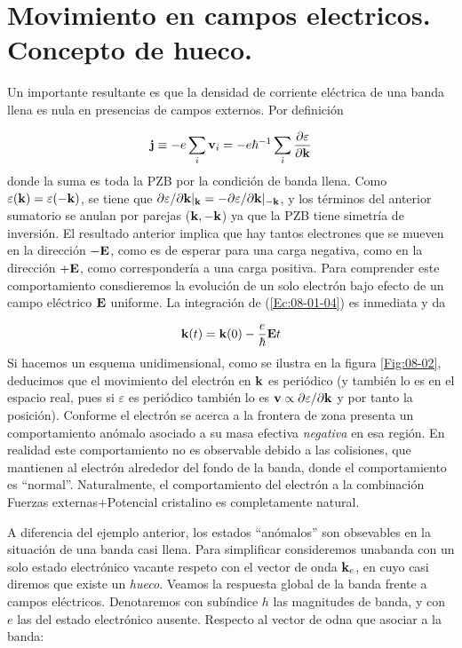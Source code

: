 \section{Movimiento en campos electricos. Concepto de hueco.}

Un importante resultante es que la densidad de corriente eléctrica de una banda llena es nula en presencias de campos externos. Por definición 

\begin{equation*}
	\mathbf{j} \equiv - e \sum_i \mathbf{v}_i= -e \hbar^{-1} \sum_i \frac{\partial \varepsilon}{\partial \mathbf{k}}
\end{equation*}
donde la suma es toda la PZB por la condición de banda llena. Como $\varepsilon(\mathbf{k})=\varepsilon(-\mathbf{k})$, se tiene que $\partial \varepsilon / \partial \mathbf{k} |_{\mathbf{k}} = - \partial \varepsilon / \partial \mathbf{k} |_{-\mathbf{k}}$, y los términos del anterior sumatorio se anulan por parejas ($\mathbf{k},-\mathbf{k}$) ya que la PZB tiene simetría de inversión. El resultado anterior implica que hay tantos electrones que se mueven en la dirección $-\mathbf{E}$, como es de esperar para una carga negativa, como en la dirección $+\mathbf{E}$, como correspondería a una carga positiva. Para comprender este comportamiento consdieremos la evolución de un solo electrón bajo efecto de un campo eléctrico $\mathbf{E}$ uniforme. La integración de (\ref{Ec:08-01-04}) es inmediata y da 

\begin{equation}
	\mathbf{k} (t) = \mathbf{k}(0) - \frac{e}{\hbar} \mathbf{E} t
\end{equation}
Si hacemos un esquema unidimensional, como se ilustra en la figura \ref{Fig:08-02}, deducimos que el movimiento del electrón en $\mathbf{k}$ es periódico (y también lo es en el espacio real, pues si $\varepsilon$ es periódico también lo es $\mathbf{v} \propto \partial \varepsilon / \partial \mathbf{k}$ y por tanto la posición). Conforme el electrón se acerca a la frontera de zona presenta un comportamiento anómalo asociado a su masa efectiva \textit{negativa} en esa región. En realidad este comportamiento no es observable debido a las colisiones,  que mantienen al electrón alrededor del fondo de la banda, donde el comportamiento es ``normal''. Naturalmente, el comportamiento del electrón a la combinación Fuerzas externas+Potencial cristalino es completamente natural.

A diferencia del ejemplo anterior, los estados ``anómalos'' son obsevables en la situación de una banda casi llena. Para simplificar consideremos unabanda con un solo estado electrónico vacante respeto con el vector de onda $\mathbf{k}_e$, en cuyo casi diremos que existe un \textit{hueco}. Veamos la respuesta global de la banda frente a campos eléctricos. Denotaremos con subíndice $h$ las magnitudes de banda, y con $e$ las del estado electrónico ausente. Respecto al vector de odna que asociar a la banda:

